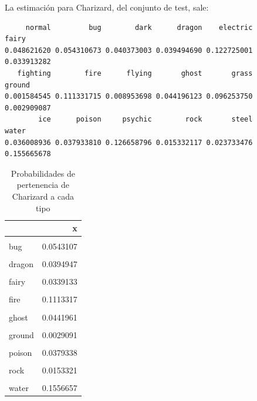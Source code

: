 \documentclass[
  12pt,
]{extreport}
\begin{document}
La estimación para Charizard, del conjunto de test, sale:

\begin{verbatim}
     normal         bug        dark      dragon    electric       fairy 
0.048621620 0.054310673 0.040373003 0.039494690 0.122725001 0.033913282 
   fighting        fire      flying       ghost       grass      ground 
0.001584545 0.111331715 0.008953698 0.044196123 0.096253750 0.002909087 
        ice      poison     psychic        rock       steel       water 
0.036008936 0.037933810 0.126658796 0.015332117 0.023733476 0.155665678 
\end{verbatim}

\begin{table}[H]
\centering
\caption{Probabilidades de pertenencia de Charizard a cada tipo}
\centering
\fontsize{9}{11}\selectfont
\begin{tabular}[t]{lr}
\toprule
  & x\\
\midrule
\cellcolor{gray!10}{normal} & \cellcolor{gray!10}{0.0486216}\\
bug & 0.0543107\\
\cellcolor{gray!10}{dark} & \cellcolor{gray!10}{0.0403730}\\
dragon & 0.0394947\\
\cellcolor{gray!10}{electric} & \cellcolor{gray!10}{0.1227250}\\
\addlinespace
fairy & 0.0339133\\
\cellcolor{gray!10}{fighting} & \cellcolor{gray!10}{0.0015845}\\
fire & 0.1113317\\
\cellcolor{gray!10}{flying} & \cellcolor{gray!10}{0.0089537}\\
ghost & 0.0441961\\
\addlinespace
\cellcolor{gray!10}{grass} & \cellcolor{gray!10}{0.0962537}\\
ground & 0.0029091\\
\cellcolor{gray!10}{ice} & \cellcolor{gray!10}{0.0360089}\\
poison & 0.0379338\\
\cellcolor{gray!10}{psychic} & \cellcolor{gray!10}{0.1266588}\\
\addlinespace
rock & 0.0153321\\
\cellcolor{gray!10}{steel} & \cellcolor{gray!10}{0.0237335}\\
water & 0.1556657\\
\bottomrule
\end{tabular}
\end{table}
\end{document}
